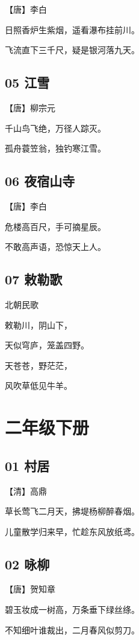 \documentclass[12pt]{article}
\begin{document}
【唐】李白

日照香炉生紫烟，遥看瀑布挂前川。

飞流直下三千尺，疑是银河落九天。

\subsection*{05 江雪}

【唐】柳宗元

千山鸟飞绝，万径人踪灭。

孤舟蓑笠翁，独钓寒江雪。

\subsection*{06 夜宿山寺}

【唐】李白

危楼高百尺，手可摘星辰。

不敢高声语，恐惊天上人。

\subsection*{07 敕勒歌}

北朝民歌

敕勒川，阴山下，

天似穹庐，笼盖四野。

天苍苍，野茫茫，

风吹草低见牛羊。

\newpage

\section*{二年级下册}

\subsection*{01 村居}

【清】高鼎

草长莺飞二月天，拂堤杨柳醉春烟。

儿童散学归来早，忙趁东风放纸鸢。

\subsection*{02 咏柳}

【唐】贺知章

碧玉妆成一树高，万条垂下绿丝绦。

不知细叶谁裁出，二月春风似剪刀。
\end{document}

